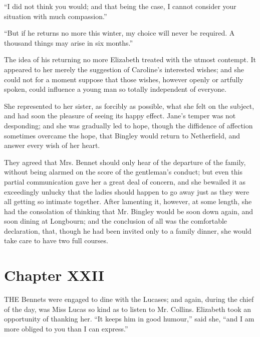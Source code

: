 \documentclass[12pt,openright]{book}
\begin{document}
“I did not think you would; and that being the case, I cannot consider your situation with much compassion.”

“But if he returns no more this winter, my choice will never be required. A thousand things may arise in six months.”

The idea of his returning no more Elizabeth treated with the utmost contempt. It appeared to her merely the suggestion of Caroline’s interested wishes; and she could not for a moment suppose that those wishes, however openly or artfully spoken, could influence a young man so totally independent of everyone.

She represented to her sister, as forcibly as possible, what she felt on the subject, and had soon the pleasure of seeing its happy effect. Jane’s temper was not desponding; and she was gradually led to hope, though the diffidence of affection sometimes overcame the hope, that Bingley would return to Netherfield, and answer every wish of her heart.

They agreed that Mrs. Bennet should only hear of the departure of the family, without being alarmed on the score of the gentleman’s conduct; but even this partial communication gave her a great deal of concern, and she bewailed it as exceedingly unlucky that the ladies should happen to go away just as they were all getting so intimate together. After lamenting it, however, at some length, she had the consolation of thinking that Mr. Bingley would be soon down again, and soon dining at Longbourn; and the conclusion of all was the comfortable declaration, that, though he had been invited only to a family dinner, she would take care to have two full courses.

\chapter{Chapter XXII}

\noindent  THE Bennets were engaged to dine with the Lucases; and again, during the chief of the day, was Miss Lucas so kind as to listen to Mr. Collins. Elizabeth took an opportunity of thanking her. “It keeps him in good humour,” said she, “and I am more obliged to you than I can express.”
\end{document}
